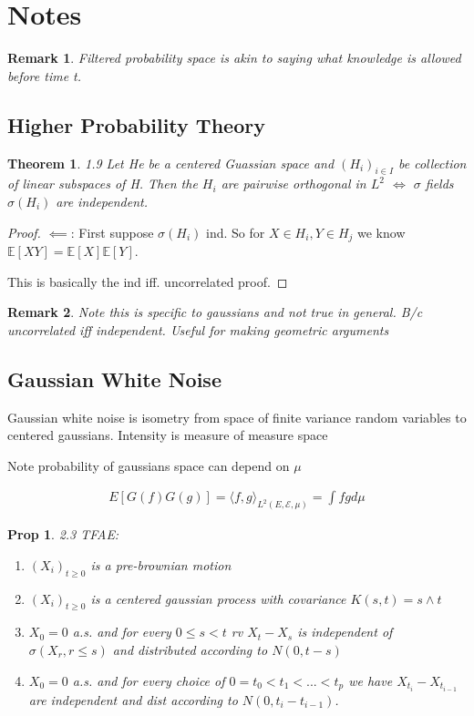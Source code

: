\documentclass[11pt]{article}
\newcommand{\E}{\mathbb{E}}
\newtheorem{prop}{Prop}
\newtheorem{remark}{Remark}
\newtheorem{theorem}{Theorem}
\begin{document}
\section{Notes}

\begin{remark}
	Filtered probability space is akin to saying what knowledge is allowed before time t.
\end{remark}

\subsection{Higher Probability Theory}

\begin{theorem}1.9
	Let He be a centered Guassian space and $(H_i)_{i \in I}$ be collection of linear subspaces of H. Then the $H_i$ are pairwise orthogonal in $L^2$ $\iff$ $\sigma$ fields $\sigma(H_i)$ are independent.
\end{theorem}

\begin{proof}
	$\impliedby$: First suppose $\sigma(H_i)$ ind. So for $X \in H_i, Y \in H_j$ we know $\E[XY] = \E[X]\E[Y]$. 

	This is basically the ind iff. uncorrelated proof. 
\end{proof}

\begin{remark}
	Note this is specific to gaussians and not true in general. B/c uncorrelated iff independent. Useful for making geometric arguments
\end{remark}

\subsection{Gaussian White Noise}

Gaussian white noise is isometry from space of finite variance random variables to centered gaussians. Intensity is measure of measure space

Note probability of gaussians space can depend on $\mu$

\begin{align*}
	E[G(f)G(g)] = \langle f,g\rangle_{L^2(E,\mathcal{E},\mu)} = \int fg d\mu
\end{align*}

\begin{prop} 2.3
	TFAE: 
	\begin{enumerate}
		\item $(X_i)_{t \geq 0}$ is a pre-brownian motion\\
		\item $(X_i)_{t \geq 0}$ is a centered gaussian process with covariance $K(s,t) = s \wedge t$
		\item $X_0 = 0$ a.s. and for every $0 \leq s < t$ rv $X_t - X_s$ is independent of $\sigma(X_r,r\leq s)$ and distributed according to $N(0,t-s)$
		\item $X_0 = 0$ a.s. and for every choice of $0 = t_0 < t_1 < ... < t_p$ we have $X_{t_i} - X_{t_{i-1}}$ are independent and dist according to $N(0,t_i-t_{i-1})$.
	\end{enumerate}
\end{prop}
\end{document}
